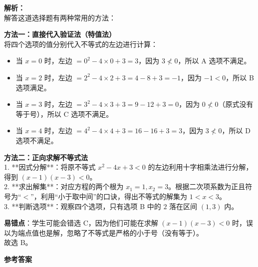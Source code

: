 \documentclass[12pt,a4paper]{exam-zh}
\newcommand{\questiontotal}{20}
\let\answerkeytotal\questiontotal
\newcommand{\answerkeyitems}{}
\begin{document}
\begin{solution}
    \textbf{解析：} \\
    解答这道选择题有两种常用的方法：
    
    \textbf{方法一：直接代入验证法（特值法）} \\
    将四个选项的值分别代入不等式的左边进行计算：
    \begin{itemize}
        \item 当 $x = 0$ 时，左边 $= 0^2 - 4 \times 0 + 3 = 3$，因为 $3 \nless 0$，所以 A 选项不满足。
        \item 当 $x = 2$ 时，左边 $= 2^2 - 4 \times 2 + 3 = 4 - 8 + 3 = -1$，因为 $-1 < 0$，所以 B 选项满足。
        \item 当 $x = 3$ 时，左边 $= 3^2 - 4 \times 3 + 3 = 9 - 12 + 3 = 0$，因为 $0 \nless 0$（原式没有等于号），所以 C 选项不满足。
        \item 当 $x = 4$ 时，左边 $= 4^2 - 4 \times 4 + 3 = 16 - 16 + 3 = 3$，因为 $3 \nless 0$，所以 D 选项不满足。
    \end{itemize}
    
    \textbf{方法二：正向求解不等式法} \\
    1. **因式分解**：将原不等式 $x^2 - 4x + 3 < 0$ 的左边利用十字相乘法进行分解，得到 $(x - 1)(x - 3) < 0$。 \\
    2. **求出解集**：对应方程的两个根为 $x_1 = 1, x_2 = 3$。根据二次项系数为正且符号为“$<$”，利用“小于取中间”的口诀，得出不等式的解集为 $1 < x < 3$。 \\
    3. **判断选项**：观察四个选项，只有选项 B 中的 $2$ 落在区间 $(1, 3)$ 内。
    
    \textbf{易错点}：学生可能会错选 C，因为他们可能在求解 $(x-1)(x-3)<0$ 时，误以为端点值也是解，忽略了不等式是严格的小于号（没有等于）。 \\
    故选 B。
\end{solution}

\newpage

\begin{center}
\textbf{参考答案}

\end{center}
\end{document}
